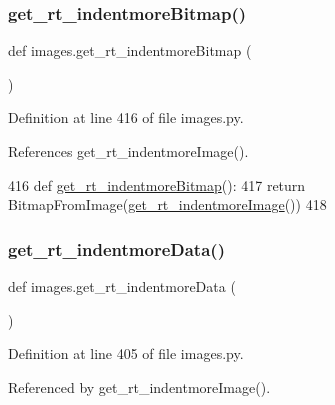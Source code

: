 \subsubsection{\texorpdfstring{get\+\_\+rt\+\_\+indentmore\+Bitmap()}{get\_rt\_indentmoreBitmap()}}
{\footnotesize\ttfamily def images.\+get\+\_\+rt\+\_\+indentmore\+Bitmap (\begin{DoxyParamCaption}{ }\end{DoxyParamCaption})}



Definition at line 416 of file images.\+py.



References get\+\_\+rt\+\_\+indentmore\+Image().


\begin{DoxyCode}
416 \textcolor{keyword}{def }\hyperlink{namespaceimages_ae925d38b26aed70dce5b33f1c5d440cf}{get\_rt\_indentmoreBitmap}():
417     \textcolor{keywordflow}{return} BitmapFromImage(\hyperlink{namespaceimages_a8bfc6d18301fb3b884715866edaac635}{get\_rt\_indentmoreImage}())
418 
\end{DoxyCode}
\mbox{\label{namespaceimages_a9f00d442ac6533725d70f75e8a0e7bde}} 
\subsubsection{\texorpdfstring{get\+\_\+rt\+\_\+indentmore\+Data()}{get\_rt\_indentmoreData()}}
{\footnotesize\ttfamily def images.\+get\+\_\+rt\+\_\+indentmore\+Data (\begin{DoxyParamCaption}{ }\end{DoxyParamCaption})}



Definition at line 405 of file images.\+py.



Referenced by get\+\_\+rt\+\_\+indentmore\+Image().



